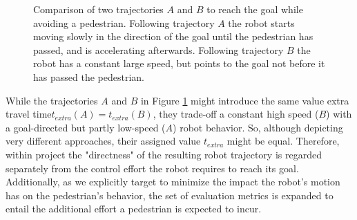 \begin{figure}[!ht]
\begin{center}
\end{center}
\caption{Comparison of two trajectories $A$ and $B$ to reach the goal while avoiding a pedestrian. Following trajectory $A$ the robot starts moving slowly in the direction of the goal until the pedestrian has passed, and is accelerating afterwards. Following trajectory $B$ the robot has a constant large speed, but points to the goal not before it has passed the pedestrian.}
\label{img:extra_time}
\end{figure}

While the trajectories $A$ and $B$ in Figure \ref{img:extra_time} might introduce the same value extra travel time$t_{extra}(A) = t_{extra}(B)$, they trade-off a constant high speed ($B$) with a goal-directed but partly low-speed ($A$) robot behavior. So, although depicting very different approaches, their assigned value  $t_{extra}$ might be equal. Therefore, within project \project the "directness" of the resulting robot trajectory is regarded separately from the control effort the robot requires to reach its goal. Additionally, as we explicitly target to minimize the impact the robot's motion has on the pedestrian's behavior, the set of evaluation metrics is expanded to entail the additional effort a pedestrian is expected to incur.  

